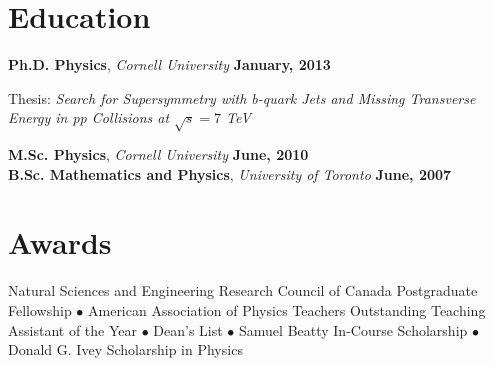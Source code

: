 \documentclass[margin,line]{res}
\newenvironment{list1}{
  \begin{list}{\ding{113}}{%
      \setlength{\itemsep}{0in}
      \setlength{\parsep}{0in} \setlength{\parskip}{0in}
      \setlength{\topsep}{0in} \setlength{\partopsep}{0in} 
      \setlength{\leftmargin}{0.17in}}}{\end{list}}
\begin{document}
\begin{resume}
\section{\sc Education}
{\bf Ph.D. Physics}, \textit{Cornell University} \hfill {\bf January,
  2013}\\
\vspace*{-.1in}
\begin{list1}
\item[] Thesis: \textit{Search for Supersymmetry with b-quark Jets and Missing
\newline \hspace*{10.5 mm} Transverse Energy in pp Collisions at $\sqrt{s}=7$ TeV}
\end{list1}
\vspace{-.1in}
{\bf M.Sc. Physics}, \textit{Cornell University} \hfill {\bf June, 2010}\\
{\bf B.Sc. Mathematics and Physics}, \textit{University of Toronto} \hfill {\bf June, 2007}\\
\vspace*{-.1in}
\vspace{-.3cm}

\section{\sc Awards} 
\renewcommand{\arraystretch}{1.5}\addtolength{\tabcolsep}{-1pt}

Natural Sciences and Engineering Research Council of Canada Postgraduate Fellowship 
$\bullet$ American Association of Physics Teachers Outstanding Teaching Assistant of the Year  
$\bullet$ Dean's List
$\bullet$ Samuel Beatty In-Course Scholarship 
$\bullet$ Donald G. Ivey Scholarship in Physics



\end{resume}
\end{document}
